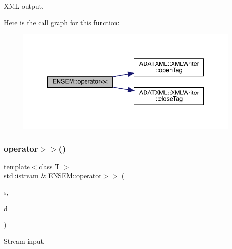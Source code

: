 X\+ML output. 

Here is the call graph for this function\+:\nopagebreak
\begin{figure}[H]
\begin{center}
\leavevmode
\includegraphics[width=336pt]{da/dc7/group__rcomplex_gaa63187dcbe17285c7d04fd9887d97b6a_cgraph}
\end{center}
\end{figure}
\mbox{\label{group__rcomplex_ga8c6191376b048bab19190ecad0d19772}} 
\subsubsection{\texorpdfstring{operator$>$$>$()}{operator>>()}\hspace{0.1cm}{\footnotesize\ttfamily [1/2]}}
{\footnotesize\ttfamily template$<$class T $>$ \\
std\+::istream \& E\+N\+S\+E\+M\+::operator$>$$>$ (\begin{DoxyParamCaption}\item[{std\+::istream \&}]{s,  }\item[{\mbox{\hyperlink{classENSEM_1_1RComplex}{R\+Complex}}$<$ T $>$ \&}]{d }\end{DoxyParamCaption})\hspace{0.3cm}{\ttfamily [inline]}}



Stream input. 

\mbox{\label{group__rcomplex_ga6dccaeb2f80acd5c96bc96d929a72852}} 
